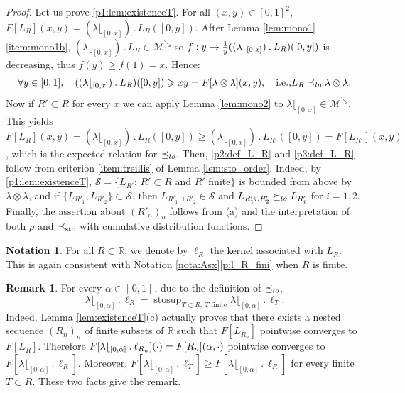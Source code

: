 \documentclass[11pt]{article}
\newcommand{\ie}{i.e.,\xspace}
\newcommand{\ldot}{\mathbin{.}}
\newcommand\mto{\mathchoice{\longmapsto}{\mapsto}{\mapsto}{\mapsto}}
\theoremstyle{plain}
\theoremstyle{definition}
\newtheorem{notation}[them]{Notation} %
\newtheorem{rem}[them]{Remark}
\newcommand{\la}{\lambda}
\newcommand{\R}{\mathbb{R}}
\newcommand{\stosup}{\operatorname{stosup}}
\newcommand{\leqs}{\preceq_{\text{\rm sto}}}
\newcommand{\mdec}{\mathcal{M}^{\scriptscriptstyle\searrow}}
\newcommand{\op}{\mathopen}
\newcommand{\clo}{\mathclose}
\newcommand{\leqlc}{\preceq_{\rm lo}}
\newcommand{\geqlc}{\succeq_{\rm lo}}
\begin{document}
\begin{proof} Let us prove \eqref{p1:lem:existenceT}. For all $(x,y)\in[0,1]^2$, $F[L_R](x,y)=(\la\lfloor_{[0,x]})\ldot L_R([0,y])$. After Lemma \ref{lem:mono1}\eqref{item:mono1b}, $(\la\lfloor_{[0,x]})\ldot L_R\in\mdec$ so $f:y\mto\frac1y((\la\lfloor_{[0,x]})\ldot L_R)([0,y])$ is decreasing, thus $f(y)\geq f(1)=x$. Hence:
\[
\forall y\in[0,1],\quad ((\la\lfloor_{[0,x]})\ldot L_R)([0,y])\geqslant xy=F[\la\otimes\la](x,y),\quad \text{\ie} L_R\leqlc \la\otimes\la.
\]
Now if $R'\subset R$ for every $x$ we can apply Lemma \ref{lem:mono2} to $\la\lfloor_{[0,x]}\in\mdec$. This yields $F[L_{R}](x,y)=(\la\lfloor_{[0,x]})\ldot L_{R}([0,y])\geqslant(\la\lfloor_{[0,x]})\ldot L_{R'}([0,y])=F[L_{R'}](x,y)$, which is the expected relation for $\leqlc$. Then, \eqref{p2:def_L_R} and \eqref{p3:def_L_R} follow from criterion \eqref{item:treillis} of Lemma \ref{lem:sto_order}. Indeed, by \eqref{p1:lem:existenceT}, $\mathcal{S}=\{L_{R'}:\,R'\subset R$ and $R'$ finite$\}$ is bounded from above by $\la\otimes\la$, and if $\{L_{R'_1},L_{R'_2}\}\subset\mathcal{S}$, then $L_{R'_1\cup R'_2}\in\mathcal{S}$ and $L_{R'_1\cup R'_2}\geqlc L_{R'_i}$ for $i=1,2$. Finally, the assertion about $(R'_n)_n$ follows from (a) and the interpretation of both $\rho$ and $\leqs$ with cumulative distribution functions.\end{proof}

\begin{notation}\label{nota:kernel_tS}For all $R\subset \R$, we denote by $\ell_R$ the kernel associated with $L_R$. This is again consistent with Notation \ref{nota:Asx}\eqref{p:l_R_fini} when $R$ is finite.
\end{notation}

\begin{rem}For every $\alpha\in \op]0,1\clo[$, due to the definition of $\leqlc$,
\[
\la\lfloor_{[0,\alpha]}{}\ldot\ell_R=\stosup_{T\subset R,\ T\text{ finite}} \la\lfloor_{[0,\alpha]}{}\ldot\ell_T.
\]
Indeed, Lemma \ref{lem:existenceT}(c) actually proves that there exists a nested sequence $(R_n)_n$ of finite subsets of $\R$ such that $F[L_{R_n}]$ pointwise converges to $F[L_R]$. Therefore $F[\la\lfloor_{[0,\alpha]}{}\ldot\nobreak\ell_{R_n}](\cdot)=F[R_n](\alpha,\cdot)$ pointwise converges to $F[\la\lfloor_{[0,\alpha]}{}\ldot\ell_{R}]$. Moreover, $F[\la\lfloor_{[0,\alpha]}{}\ldot\ell_{T}]\!\geq\!F[\la\lfloor_{[0,\alpha]}{}\ldot\ell_{R}]$ for every finite $T\!\subset\! R$. These two facts give the \hbox{remark}.
\end{rem}
\end{document}
